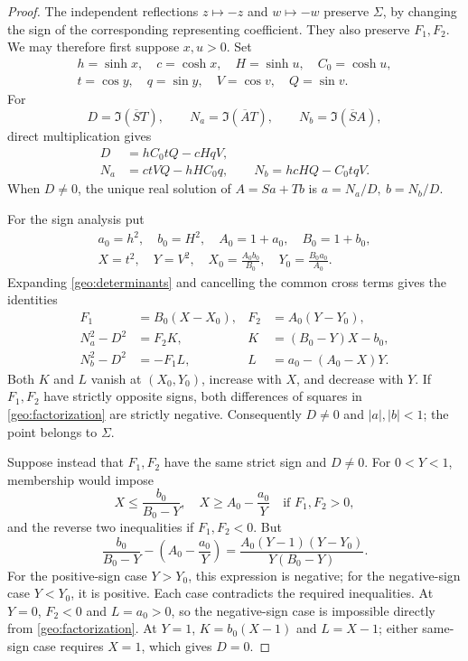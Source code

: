 \documentclass[11pt]{article}
\numberwithin{equation}{section}
\theoremstyle{definition}
\begin{document}
\begin{proof}
The independent reflections \(z\mapsto-z\) and \(w\mapsto-w\)
preserve \(\Sigma\), by changing the sign of the corresponding
representing coefficient.  They also preserve \(F_1,F_2\).
We may therefore first suppose \(x,u>0\).  Set
\[
 \begin{gathered}
 h=\sinh x,\quad c=\cosh x,\quad H=\sinh u,\quad C_0=\cosh u,\\
 t=\cos y,\quad q=\sin y,\quad V=\cos v,\quad Q=\sin v.
 \end{gathered}
\]
For
\[
 D=\Im(\overline S T),\qquad
 N_a=\Im(\overline A T),\qquad N_b=\Im(\overline S A),
\]
direct multiplication gives
\begin{align}
 D&=hC_0tQ-cHqV,\nonumber\\
 N_a&=ctVQ-hHC_0q,\qquad
 N_b=hcHQ-C_0tqV. \label{geo:determinants}
\end{align}
When \(D\ne0\), the unique real solution of \(A=Sa+Tb\) is
\(a=N_a/D,\ b=N_b/D\).

For the sign analysis put
\[
 \begin{gathered}
 a_0=h^2,\quad b_0=H^2,\quad A_0=1+a_0,\quad B_0=1+b_0,\\
 X=t^2,\quad Y=V^2,\quad
 X_0=\frac{A_0b_0}{B_0},\quad Y_0=\frac{B_0a_0}{A_0}.
 \end{gathered}
\]
Expanding \eqref{geo:determinants} and cancelling the common cross
terms gives the identities
\begin{align}
 F_1&=B_0(X-X_0),& F_2&=A_0(Y-Y_0),\nonumber\\
 N_a^2-D^2&=F_2K,&K&=(B_0-Y)X-b_0,\label{geo:factorization}\\
 N_b^2-D^2&=-F_1L,&L&=a_0-(A_0-X)Y.\nonumber
\end{align}
Both \(K\) and \(L\) vanish at \((X_0,Y_0)\), increase with
\(X\), and decrease with \(Y\).  If \(F_1,F_2\) have strictly
opposite signs, both differences of squares in
\eqref{geo:factorization} are strictly negative.  Consequently
\(D\ne0\) and \(|a|,|b|<1\); the point belongs to \(\Sigma\).

Suppose instead that \(F_1,F_2\) have the same strict sign and
\(D\ne0\).  For \(0<Y<1\), membership would impose
\[
 X\leq\frac{b_0}{B_0-Y},\quad
 X\geq A_0-\frac{a_0}{Y}
 \quad\text{if }F_1,F_2>0,
\]
and the reverse two inequalities if \(F_1,F_2<0\).  But
\begin{equation}\label{geo:threshold-difference}
 \frac{b_0}{B_0-Y}-\left(A_0-\frac{a_0}{Y}\right)
 =\frac{A_0(Y-1)(Y-Y_0)}{Y(B_0-Y)}.
\end{equation}
For the positive-sign case \(Y>Y_0\), this expression is negative;
for the negative-sign case \(Y<Y_0\), it is positive.  Each case
contradicts the required inequalities.  At \(Y=0\), \(F_2<0\)
and \(L=a_0>0\), so the negative-sign case is impossible directly
from \eqref{geo:factorization}.  At \(Y=1\),
\(K=b_0(X-1)\) and \(L=X-1\); either same-sign case requires
\(X=1\), which gives \(D=0\).


\end{proof}
\end{document}
